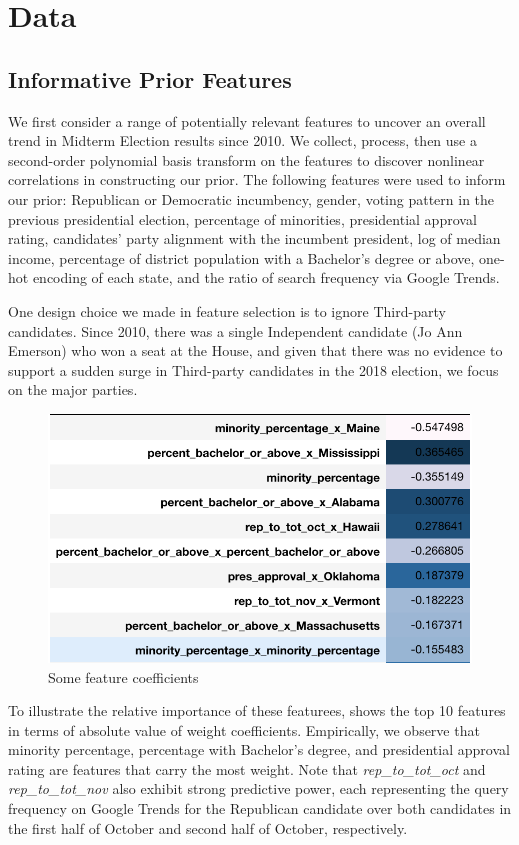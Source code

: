 \documentclass[11pt]{article}
\begin{document}
\section{Data}
\label{sec:data}
\subsection{Informative Prior Features}
We first consider a range of potentially relevant features to uncover an overall trend in Midterm Election results since 2010. We collect, process, then use a second-order polynomial basis transform on the features to discover nonlinear correlations in constructing our prior. The following features were used to inform our prior: Republican or Democratic incumbency, gender, voting pattern in the previous presidential election, percentage of minorities, presidential approval rating, candidates’ party alignment with the incumbent president, log of median income, percentage of district population with a Bachelor’s degree or above, one-hot encoding of each state, and the ratio of search frequency via Google Trends.

 One design choice we made in feature selection is to ignore Third-party candidates. Since 2010, there was a single Independent candidate (Jo Ann Emerson) who won a seat at the House, and given that there was no evidence to support a sudden surge in Third-party candidates in the 2018 election, we focus on the major parties.

 \begin{figure}[tbh]
  \centering
  \includegraphics[scale=0.8]{feature_coeff}
  \caption{Some feature coefficients}
  \label{fig:feature}
\end{figure}

To illustrate the relative importance of these featurees,  shows the top 10
features in terms of absolute value of weight coefficients. Empirically, we observe that minority percentage, percentage with Bachelor's degree, and presidential approval rating are features that carry the most weight. Note that \textit{rep\_to\_tot\_oct} and \textit{rep\_to\_tot\_nov} also exhibit strong predictive power, each representing the query frequency on Google Trends for the Republican candidate over both candidates in the first half of October and second half of October, respectively.
\end{document}
